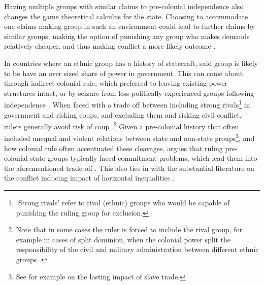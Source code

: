 \documentclass[12pt]{article}
\begin{document}
Having multiple groups with similar claims to pre-colonial independence also
changes the game theoretical calculus for the state. Choosing to accommodate one
claims-making group in such an environment could lead to further claims by
similar groups, making the option of punishing any group who makes demands
relatively cheaper, and thus making conflict a more likely outcome
\citep{Wishman}.

In countries where an ethnic group has a history of statecraft, said group is
likely to be have an over sized share of power in government. This can come
about through indirect colonial rule, which preferred to leaving existing power
structures intact, or by seizure from less politically experienced groups
following independence \citep{Paine2019}. When faced with a trade off between
including strong rivals\footnote{`Strong rivals' refer to rival (ethnic) groups
who would be capable of punishing the ruling group for exclusion.} in government
and risking coups, and excluding them and risking civil conflict, rulers
generally avoid risk of coup \citep{Paine2019, Powell_2014,
	Roessler_2011}.\footnote{Note that in some cases the ruler is forced to
include the rival group, for example in cases of split dominion, when the
colonial power split the responsibility of the civil and military administration
between different ethnic groups \citep{Paine2019}.} Given a pre-colonial history
that often included unequal and violent relations between state and non-state
groups\footnote{See for example \citet{Nunn2008} on the lasting impact of slave
trade.}, and how colonial rule often accentuated these cleavages,
\citet{Paine2019} argues that ruling pre-colonial state groups typically faced
commitment problems, which lead them into the aforementioned trade-off
\citep{Paine2019}. This also ties in with the substantial literature on the
conflict inducing impact of horizontal inequalities \citep{CEDERMAN_2011}.
\end{document}

